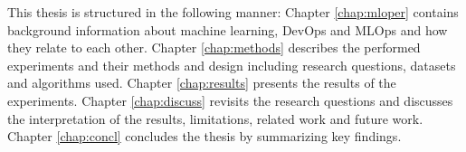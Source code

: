 This thesis is structured in the following manner: Chapter \ref{chap:mloper} contains background information about machine learning, DevOps and MLOps and how they relate to each other. Chapter \ref{chap:methods} describes the performed experiments and their methods and design including research questions, datasets and algorithms used. Chapter \ref{chap:results} presents the results of the experiments. Chapter \ref{chap:discuss} revisits the research questions and discusses the interpretation of the results, limitations, related work and future work. Chapter \ref{chap:concl} concludes the thesis by summarizing key findings.